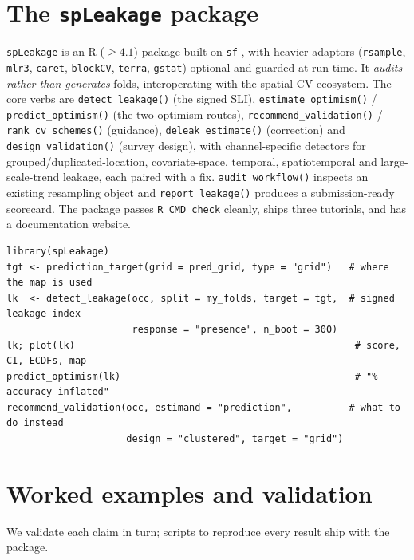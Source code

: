 \documentclass[11pt,a4paper]{article}
\begin{document}
\section{The \texttt{spLeakage} package}\label{sec:software}

\texttt{spLeakage} is an R ($\ge 4.1$) package built on \texttt{sf}
\citep{pebesma2018sf}, with heavier adaptors (\texttt{rsample}, \texttt{mlr3},
\texttt{caret}, \texttt{blockCV}, \texttt{terra}, \texttt{gstat}) optional and
guarded at run time. It \emph{audits rather than generates} folds, interoperating
with the spatial-CV ecosystem. The core verbs are \texttt{detect\_leakage()} (the
signed SLI), \texttt{estimate\_optimism()} / \texttt{predict\_optimism()} (the two
optimism routes), \texttt{recommend\_validation()} / \texttt{rank\_cv\_schemes()}
(guidance), \texttt{deleak\_estimate()} (correction) and \texttt{design\_validation()}
(survey design), with channel-specific detectors for grouped/duplicated-location,
covariate-space, temporal, spatiotemporal and large-scale-trend leakage, each paired
with a fix. \texttt{audit\_workflow()} inspects an existing resampling object and
\texttt{report\_leakage()} produces a submission-ready scorecard. The package passes
\texttt{R CMD check} cleanly, ships three tutorials, and has a documentation website.

\begin{lstlisting}[caption={Auditing an existing species-distribution-model
validation in five lines.},captionpos=b]
library(spLeakage)
tgt <- prediction_target(grid = pred_grid, type = "grid")   # where the map is used
lk  <- detect_leakage(occ, split = my_folds, target = tgt,  # signed leakage index
                      response = "presence", n_boot = 300)
lk; plot(lk)                                                 # score, CI, ECDFs, map
predict_optimism(lk)                                         # "% accuracy inflated"
recommend_validation(occ, estimand = "prediction",          # what to do instead
                     design = "clustered", target = "grid")
\end{lstlisting}

\section{Worked examples and validation}\label{sec:examples}

We validate each claim in turn; scripts to reproduce every result ship with the
package.
\end{document}

